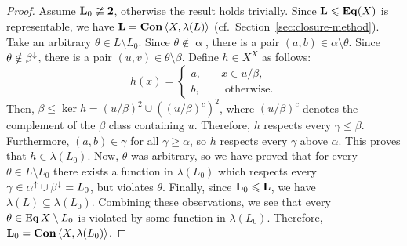 \vskip3mm

\begin{center}
\end{center}

\vskip3mm

\begin{proof}
  Assume $\mathbf{L}_0 \ncong \mathbf{2}$, otherwise the result holds trivially. 
  Since $\mathbf{L}\leqslant \mathbf{Eq}(X)$ is representable, we have $\mathbf{L} = \mathbf{Con\,}
  \langle X, \lambda(L)\rangle$ (cf.~Section~\ref{sec:closure-method}).  Take an arbitrary
  $\theta \in L \setminus L_0$. Since $\theta \notin \upalpha$, 
  there is a pair 
  $(a,b) \in \alpha \setminus \theta$.  Since $\theta \notin \beta^{\downarrow}$, there is
  a pair $(u,v)\in \theta\setminus \beta$. Define $h\in X^X$ as follows:
  \begin{equation*}
    h(x) = \begin{cases}
      a,& \quad x\in u/\beta,\\
      b,& \quad \text{ otherwise.}
    \end{cases}
  \end{equation*}
  Then, $\beta \leq \ker h = (u/\beta)^2 \cup ((u/\beta)^c)^2$, where $(u/\beta)^c$ denotes the
  complement of the $\beta$ class containing $u$.  Therefore, $h$ respects every
  $\gamma \leq \beta$.  Furthermore, $(a, b) \in \gamma$ for all $\gamma \geq \alpha$,
  so $h$ respects every $\gamma$ above $\alpha$.  This proves that $h\in \lambda(L_0)$.
  Now, $\theta$ was arbitrary, so we have proved that for every $\theta \in L
  \setminus L_0$ there exists a function in $\lambda(L_0)$ which respects every
  $\gamma \in \alpha^{\uparrow}\cup \beta^{\downarrow} = L_0$, but violates $\theta$.  Finally,
  since 
  $\mathbf{L}_0 \leqslant \mathbf{L}$, we have $\lambda(L)\subseteq \lambda(L_0)$.  Combining these
  observations, we see that every $\theta \in \operatorname{Eq} X \setminus L_0$ is
  violated by some function in $\lambda(L_0)$. Therefore, $\mathbf{L}_0 = \mathbf{Con\,} \langle X, \lambda(L_0)\rangle$.
\end{proof}

